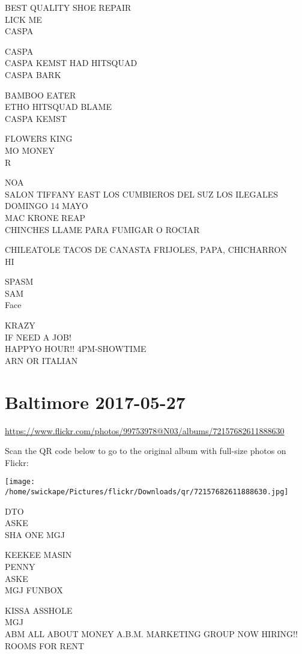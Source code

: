 \documentclass[10pt,letterpaper]{article}
\begin{document}
BEST QUALITY SHOE REPAIR\\
LICK ME\\
CASPA

CASPA\\
CASPA KEMST HAD HITSQUAD\\
CASPA BARK

BAMBOO EATER\\
ETHO HITSQUAD BLAME\\
CASPA KEMST

FLOWERS KING\\
MO MONEY\\
R

NOA\\
SALON TIFFANY EAST LOS CUMBIEROS DEL SUZ LOS ILEGALES DOMINGO 14 MAYO\\
MAC KRONE REAP\\
CHINCHES LLAME PARA FUMIGAR O ROCIAR

CHILEATOLE TACOS DE CANASTA FRIJOLES, PAPA, CHICHARRON\\
HI

SPASM\\
SAM\\
Face

KRAZY\\
IF NEED A JOB!\\
HAPPYO HOUR!! 4PM{-}SHOWTIME\\
ARN OR ITALIAN
\pagebreak

\section*{Baltimore 2017-05-27}

\url{https://www.flickr.com/photos/99753978@N03/albums/72157682611888630}

Scan the QR code below to go to the original album with full-size photos on Flickr:

\texttt{[image: /home/swickape/Pictures/flickr/Downloads/qr/72157682611888630.jpg]}
\pagebreak

DTO\\
ASKE\\
SHA ONE MGJ

KEEKEE MASIN\\
PENNY\\
ASKE\\
MGJ FUNBOX

KISSA ASSHOLE\\
MGJ\\
ABM ALL ABOUT MONEY A.B.M. MARKETING GROUP NOW HIRING!!\\
ROOMS FOR RENT
\end{document}
